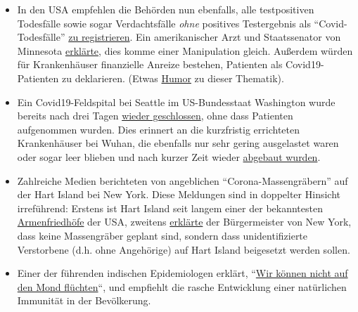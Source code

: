 \begin{itemize}
\tightlist
\item
  In den USA empfehlen die Behörden nun ebenfalls, alle testpositiven
  Todesfälle sowie sogar Verdachtsfälle \emph{ohne} positives
  Testergebnis als ``Covid-Todesfälle''
  \href{https://nypost.com/2020/04/07/feds-classify-all-coronavirus-patient-deaths-as-covid-19-deaths/?link=TD_mansionglobal_new_mansion_global.11147f181987fd93}{zu
  registrieren}. Ein amerikanischer Arzt und Staatssenator von Minnesota
  \href{https://www.valleynewslive.com/content/misc/Sen-Dr-Jensens-Shocking-Admission-About-Coronavirus-569458361.html}{erklärte},
  dies komme einer Manipulation gleich. Außerdem würden für
  Krankenhäuser finanzielle Anreize bestehen, Patienten als
  Covid19-Patienten zu deklarieren. (Etwas
  \href{https://swprs.files.wordpress.com/2020/04/cv-2019-2020.jpg}{Humor}
  zu dieser Thematik).
\item
  Ein Covid19-Feldspital bei Seattle im US-Bundesstaat Washington wurde
  bereits nach drei Tagen
  \href{https://www.yahoo.com/news/armys-seattle-field-hospital-closes-165646379.html}{wieder
  geschlossen}, ohne dass Patienten aufgenommen wurden. Dies erinnert an
  die kurzfristig errichteten Krankenhäuser bei Wuhan, die ebenfalls nur
  sehr gering ausgelastet waren oder sogar leer blieben und nach kurzer
  Zeit wieder
  \href{https://www.theguardian.com/world/2020/feb/12/what-chinas-empty-new-coronavirus-hospitals-say-about-its-secretive-system}{abgebaut
  wurden}.
\item
  Zahlreiche Medien berichteten von angeblichen ``Corona-Massengräbern''
  auf der Hart Island bei New York. Diese Meldungen sind in doppelter
  Hinsicht irreführend: Erstens ist Hart Island seit langem einer der
  bekanntesten
  \href{https://en.wikipedia.org/wiki/Hart_Island_(Bronx)\#Cemetery}{Armenfriedhöfe}
  der USA, zweitens
  \href{https://www.independent.co.uk/news/world/americas/new-york-coronavirus-cases-burials-bodies-covid-19-hart-island-a9459956.html}{erklärte}
  der Bürgermeister von New York, dass keine Massengräber geplant sind,
  sondern dass unidentifizierte Verstorbene (d.h. ohne Angehörige) auf
  Hart Island beigesetzt werden sollen.
\item
  Einer der führenden indischen Epidemiologen erklärt,
  ``\href{https://www.business-standard.com/article/current-affairs/we-cannot-run-away-to-the-moon-need-to-develop-herd-immunity-dr-muliyil-120040601232_1.html}{Wir
  können nicht auf den Mond flüchten}``, und empfiehlt die rasche
  Entwicklung einer natürlichen Immunität in der Bevölkerung.
\end{itemize}

